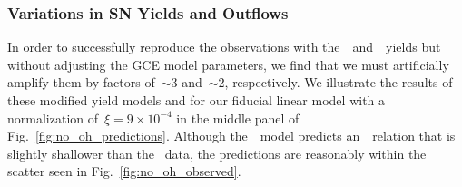 \documentclass[ms.tex]{subfiles}
\begin{document}
\subsubsection{Variations in SN Yields and Outflows}
\label{sec:results:yields:variations}

In order to successfully reproduce the observations with
the~\cristallo~and~\ventura~yields
{\color{red} but without adjusting the GCE model parameters}, we find that we
must artificially amplify them by factors of~$\sim$3 and~$\sim$2, respectively.
We illustrate the results of these modified yield models and for our fiducial
linear model with a normalization of~$\xi = 9\times10^{-4}$ in the middle panel
of Fig.~\ref{fig:no_oh_predictions}.
Although the~\ventura~model predicts an~\ohno~relation that is slightly
shallower than the~\citet{Dopita2016} data, the predictions are
reasonably within the scatter seen in Fig.~\ref{fig:no_oh_observed}.
\par
\end{document}
